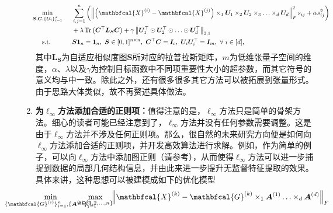 \begin{enumerate}
\begin{equation*}\vspace{-0.5em}
\hspace{1em}
\begin{aligned}
& \underset{\smash[b]{\substack{\mathclap{\boldsymbol{S},\boldsymbol{C},\{\boldsymbol{U}_{i}\}_{i=1}^{d}}}}}{\min}\qquad
& &  \sum_{i,j=1}^{n}\left(\norm{\left(\mathbfcal{X}^{(i)}-\mathbfcal{X}^{(j)}\right)\times_{1}\boldsymbol{U}_{1}\times_{2}\boldsymbol{U}_{2}\times_{3}\ldots\times_{d}\boldsymbol{U}_{d}}_{F}^{2}s_{i j}+\alpha s_{i j}^{2}\right) \\\span&&+ \lambda\operatorname{Tr}\left(\boldsymbol{C}^{\top}\boldsymbol{L}_{\boldsymbol{S}}\boldsymbol{C}\right) + \gamma \norm{\boldsymbol{U}_{1}^{\top}\odot\boldsymbol{U}_{2}^{\top}\odot\ldots\odot\boldsymbol{U}_{d}^{\top}}_{2,1}\\
& \text{s.t.}
& & \boldsymbol{S}\boldsymbol{1}_{n}=\boldsymbol{1}_{n},~\boldsymbol{S}\in[0,1]^{n\times n},~\boldsymbol{C}^{\top}\boldsymbol{C}=\boldsymbol{I}_{c},~\boldsymbol{U}_{i}\boldsymbol{U}_{i}^{\top}=\boldsymbol{I}_{m},~\forall~i\in[d],
\end{aligned}
\end{equation*}
其中$\boldsymbol{L}_{\boldsymbol{S}}$为自适应相似度图$\boldsymbol{S}$所对应的拉普拉斯矩阵，$m$为低维张量子空间的维度，$\alpha$、$\lambda$以及$\gamma$为控制目标函数中不同项重要性大小的超参数，而其它符号的意义均与中一致。除此之外，还有很多很多其它方法可以被拓展到张量形式。由于思路大体类似，故不再赘述具体做法。
    \item \textbf{为\texorpdfstring{$\ell_\infty$}{L无穷}方法添加合适的正则项：}值得注意的是，$\ell_\infty$方法只是简单的骨架方法。细心的读者可能已经注意到了，$\ell_\infty$方法并没有任何参数需要调整。这是由于$\ell_\infty$方法并不涉及任何正则项。那么，很自然的未来研究方向便是如何向$\ell_\infty$方法添加合适的正则项，并开发高效算法进行求解。例如，作为简单的例子，可以向$\ell_\infty$方法中添加图正则（请参考），从而使得$\ell_\infty$方法可以进一步捕捉到数据的局部几何结构信息，并由此来进一步提升无监督特征提取的效果。具体来讲，这种思想可以被建模成如下的优化模型
\begin{equation*}
\hspace{1em}
    \begin{aligned}
    &\underset{\smash[b]{\mathclap{\{\mathbfcal{G}^{(i)}\}_{i=1}^{n},\{\boldsymbol{A}^{(j)}\}_{j=1}^{d}}}}{\min}\qquad\quad &&\underset{\mathclap{k\in\{1,2,\ldots,n\}}}{\max}\quad \left\|\mathbfcal{X}^{(k)}-\mathbfcal{G}^{(k)} \times_{1} \boldsymbol{A}^{(1)} \ldots \times_{d} \boldsymbol{A}^{(d)}\right\|_{F}\\

\end{aligned}
\end{equation*}
\end{enumerate}
